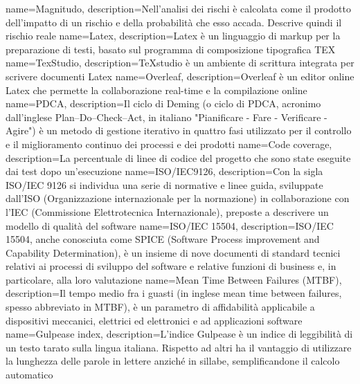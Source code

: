 {
    name=Magnitudo,
    description={Nell'analisi dei rischi è calcolata come il prodotto dell'impatto di un rischio e della probabilità che esso accada. Descrive quindi il rischio reale}
}
{
    name=Latex,
    description={Latex è un linguaggio di markup per la preparazione di testi, basato sul programma di composizione tipografica TEX}
}
{
    name=TexStudio,
    description={TeXstudio è un ambiente di scrittura integrata per scrivere documenti Latex}
}
{
    name=Overleaf,
    description={Overleaf è un editor online Latex che permette la collaborazione real-time e la compilazione online}
}
{
    name=PDCA,
    description={Il ciclo di Deming (o ciclo di PDCA, acronimo dall'inglese Plan–Do–Check–Act, in italiano "Pianificare - Fare - Verificare - Agire") è un metodo di gestione iterativo in quattro fasi utilizzato per il controllo e il miglioramento continuo dei processi e dei prodotti}
}
{
    name=Code coverage,
    description={La percentuale di linee di codice del progetto che sono state eseguite dai test dopo un'esecuzione}
}
{
    name=ISO/IEC9126,
    description={Con la sigla ISO/IEC 9126 si individua una serie di normative e linee guida, sviluppate dall'ISO (Organizzazione internazionale per la normazione) in collaborazione con l'IEC (Commissione Elettrotecnica Internazionale), preposte a descrivere un modello di qualità del software}
}
{
    name=ISO/IEC 15504,
    description={ISO/IEC 15504, anche conosciuta come SPICE (Software Process improvement and Capability Determination), è un insieme di nove documenti di standard tecnici relativi ai processi di sviluppo del software e relative funzioni di business e, in particolare, alla loro valutazione}
}
{
    name=Mean Time Between Failures (MTBF),
    description={Il tempo medio fra i guasti (in inglese mean time between failures, spesso abbreviato in MTBF), è un parametro di affidabilità applicabile a dispositivi meccanici, elettrici ed elettronici e ad applicazioni software}
}
{
    name=Gulpease index,
    description={L'indice Gulpease è un indice di leggibilità di un testo tarato sulla lingua italiana. Rispetto ad altri ha il vantaggio di utilizzare la lunghezza delle parole in lettere anziché in sillabe, semplificandone il calcolo automatico}
}

